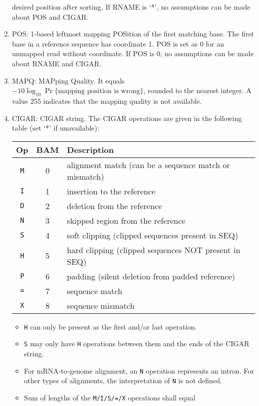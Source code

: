 \documentclass[10pt]{article}
\begin{document}
\begin{enumerate}
  desired position after sorting. If {\sf RNAME} is `*', no assumptions
  can be made about {\sf POS} and {\sf CIGAR}.
\item {\sf POS}: 1-based leftmost mapping POSition of the first matching
  base. The first base in a reference sequence has coordinate 1. {\sf
    POS} is set as 0 for an unmapped read without coordinate. If {\sf
    POS} is 0, no assumptions can be made about {\sf RNAME} and {\sf
    CIGAR}.
\item {\sf MAPQ}: MAPping Quality. It equals
  $-10\log_{10}\Pr\{\mbox{mapping position is wrong}\}$, rounded to the
  nearest integer. A value 255 indicates that the mapping quality is not
  available.
\item {\sf CIGAR}: CIGAR string. The CIGAR operations are given in the
  following table (set `*' if unavailable):
  \begin{center}\small
  \begin{tabular}{ccl}
  \hline
  Op & BAM & Description\\
  \hline
  {\tt M} & 0 & alignment match (can be a sequence match or mismatch)\\
  {\tt I} & 1 & insertion to the reference \\
  {\tt D} & 2 & deletion from the reference \\
  {\tt N} & 3 & skipped region from the reference \\
  {\tt S} & 4 & soft clipping (clipped sequences present in {\sf SEQ})\\
  {\tt H} & 5 & hard clipping (clipped sequences NOT present in {\sf SEQ})\\
  {\tt P} & 6 & padding (silent deletion from padded reference)\\
  {\tt =} & 7 & sequence match \\
  {\tt X} & 8 & sequence mismatch \\
  \hline
  \end{tabular}
  \end{center}
  \begin{itemize}
  \item {\tt H} can only be present as the first and/or last operation.
  \item {\tt S} may only have {\tt H} operations between them and the
    ends of the {\sf CIGAR} string.
  \item For mRNA-to-genome alignment, an {\tt N} operation represents an
    intron. For other types of alignments, the interpretation of {\tt N}
    is not defined.
  \item Sum of lengths of the {\tt M/I/S/=/X} operations shall equal

\end{itemize}
\end{enumerate}
\end{document}
